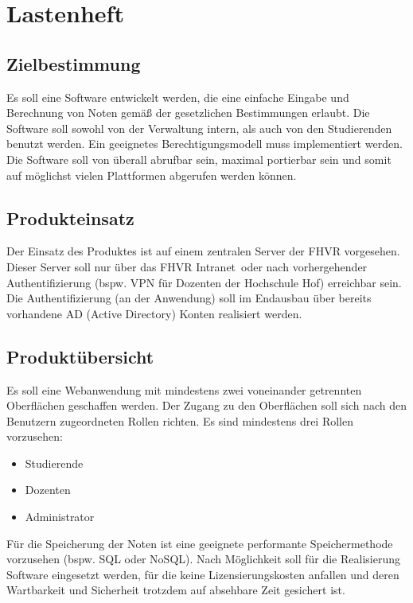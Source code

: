 \documentclass[12pt,a4paper,parskip]{scrreprt}
\begin{document}
\section{Lastenheft}
\subsection{Zielbestimmung}
Es soll eine Software entwickelt werden, die eine einfache Eingabe und Berechnung von Noten gemäß der gesetzlichen Bestimmungen erlaubt. Die Software soll sowohl von der Verwaltung intern, als auch von den Studierenden benutzt werden. Ein geeignetes Berechtigungsmodell muss implementiert werden. Die Software soll von überall abrufbar sein, maximal portierbar sein und somit auf möglichst vielen Plattformen abgerufen werden können.
\subsection{Produkteinsatz}
Der Einsatz des Produktes ist auf einem zentralen Server der FHVR vorgesehen. Dieser Server soll nur über das \glqq FHVR Intranet\grqq\ oder nach vorhergehender Authentifizierung (bspw. VPN für Dozenten der Hochschule Hof) erreichbar sein. Die Authentifizierung (an der Anwendung) soll im Endausbau über bereits vorhandene AD (Active Directory) Konten realisiert werden.
\subsection{Produktübersicht}
Es soll eine Webanwendung mit mindestens zwei voneinander getrennten Oberflächen geschaffen werden. Der Zugang zu den Oberflächen soll sich nach den Benutzern zugeordneten Rollen richten. Es sind mindestens drei Rollen vorzusehen:
\begin{itemize}
\item Studierende
\item Dozenten
\item Administrator
\end{itemize}
Für die Speicherung der Noten ist eine geeignete performante Speichermethode vorzusehen (bspw. SQL oder NoSQL).
Nach Möglichkeit soll für die Realisierung Software eingesetzt werden, für die keine Lizensierungskosten anfallen und deren Wartbarkeit und Sicherheit trotzdem auf absehbare Zeit gesichert ist.
\end{document}
